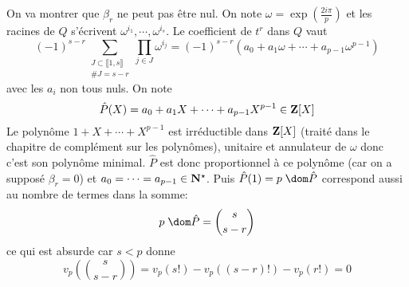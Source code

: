 \begin{itemize}
 On va montrer que  $\beta_r$ ne peut pas être nul. On note  $\omega=\exp (\frac{2i\pi }{p})$ et les racines de $Q$ s'écrivent  $\omega^{i_1},\cdots ,\omega^{i_s}$. Le coefficient de $t^r$ dans  $Q$ vaut  \[
     (-1)^{s-r}\sum_{\substack{J\subset \llbracket 1,s \rrbracket \\ \#J=s-r}}\prod_{j\in J}\omega^{i_j}=(-1)^{s-r}(a_0+a_1\omega+\cdots +a_{p-1}\omega^{p-1})
 \]
 avec les $a_i$ non tous nuls. On note \[
     \hat{P} (X)=a_0+a_1X+\cdots +a_{p-1}X^{p-1} \in \mathbf Z[X]
 \]
 Le polynôme $1+X+\cdots +X^{p-1}$ est irréductible dans $\mathbf Z[X]$ (traité dans le chapitre de complément sur les polynômes), unitaire et annulateur de $\omega$ donc c'est son polynôme minimal.  $\hat{P}$ est donc proportionnel à ce polynôme (car on a supposé $\beta_r=0$) et $a_0=\cdots =a_{p-1}\in  \mathbf N^\star$. Puis $\hat{P}(1)=p\;\dom \hat{P}$ correspond aussi au nombre de termes dans la somme: \[
     p\;\dom \hat{P}=\binom s{s-r}
 \] 
 ce qui est absurde car $s<p$ donne  \[
     v_p\left( \binom s{s-r} \right) =v_p(s!)-v_p((s-r)!)-v_p(r!)=0
 \] 
\end{itemize}

\endchapter

